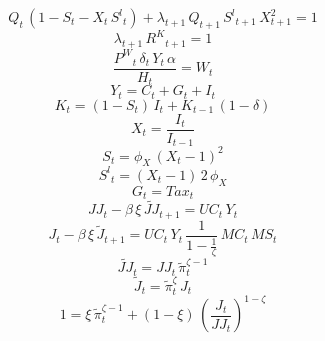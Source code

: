 \begin{dmath}
{Q}_{t}\, \left(1-{S}_{t}-{X}_{t}\, {S^{l}}_{t}\right)+{\lambda}_{t+1}\, {Q}_{t+1}\, {S^{l}}_{t+1}\, {X}_{t+1}^{2}=1
\end{dmath}
\begin{dmath}
{\lambda}_{t+1}\, {R^{K}}_{t+1}=1
\end{dmath}
\begin{dmath}
\frac{{P^{W}}_{t}\, {\delta}_{t}\, {Y}_{t}\, {{\alpha}}}{{H}_{t}}={W}_{t}
\end{dmath}
\begin{dmath}
{Y}_{t}={C}_{t}+{G}_{t}+{I}_{t}
\end{dmath}
\begin{dmath}
{K}_{t}=\left(1-{S}_{t}\right)\, {I}_{t}+{K}_{t-1}\, \left(1-{{\delta}}\right)
\end{dmath}
\begin{dmath}
{X}_{t}=\frac{{I}_{t}}{{I}_{t-1}}
\end{dmath}
\begin{dmath}
{S}_{t}={{\phi_{X}}}\, \left({X}_{t}-1\right)^{2}
\end{dmath}
\begin{dmath}
{S^{l}}_{t}=\left({X}_{t}-1\right)\, 2\, {{\phi_{X}}}
\end{dmath}
\begin{dmath}
{G}_{t}={Tax}_{t}
\end{dmath}
\begin{dmath}
{JJ}_{t}-{{\beta}}\, {{\xi}}\, {\tilde{JJ}}_{t+1}={UC}_{t}\, {Y}_{t}
\end{dmath}
\begin{dmath}
{J}_{t}-{{\beta}}\, {{\xi}}\, {\tilde{J}}_{t+1}={UC}_{t}\, {Y}_{t}\, \frac{1}{1-\frac{1}{{{\zeta}}}}\, {MC}_{t}\, {MS}_{t}
\end{dmath}
\begin{dmath}
{\tilde{JJ}}_{t}={JJ}_{t}\, {\tilde{\pi}}_{t}^{{{\zeta}}-1}
\end{dmath}
\begin{dmath}
{\tilde{J}}_{t}={\tilde{\pi}}_{t}^{{{\zeta}}}\, {J}_{t}
\end{dmath}
\begin{dmath}
1={{\xi}}\, {\tilde{\pi}}_{t}^{{{\zeta}}-1}+\left(1-{{\xi}}\right)\, \left(\frac{{J}_{t}}{{JJ}_{t}}\right)^{1-{{\zeta}}}
\end{dmath}
